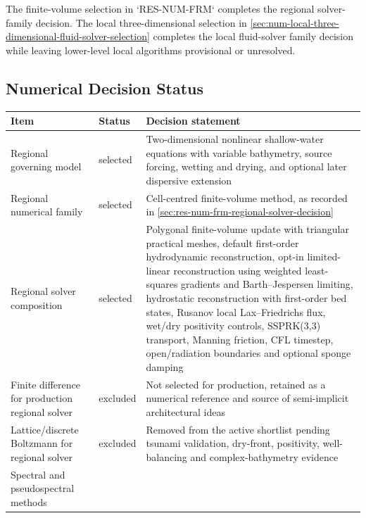 The finite-volume selection in `RES-NUM-FRM` completes the regional
solver-family decision. The local three-dimensional selection in
\cref{sec:num-local-three-dimensional-fluid-solver-selection} completes
the local fluid-solver family decision while leaving lower-level local
algorithms provisional or unresolved.

\subsection{Numerical Decision Status}
\label{sec:res-num-spec-numerical-decision-status}

\begin{table}[htbp]
  \centering
  \small
  \renewcommand{\arraystretch}{1.2}
  \begin{tabular}{
      p{}
      p{}
      p{}
    }
    \hline
    Item
    &
    Status
    &
    Decision statement
    \\
    \hline
    Regional governing model
    &
    selected
    &
    Two-dimensional nonlinear shallow-water equations with variable
    bathymetry, source forcing, wetting and drying, and optional later
    dispersive extension
    \\
    Regional numerical family
    &
    selected
    &
    Cell-centred finite-volume method, as recorded in
    \cref{sec:res-num-frm-regional-solver-decision}
    \\
    Regional solver composition
    &
    selected
    &
    Polygonal finite-volume update with triangular practical meshes,
    default first-order hydrodynamic reconstruction, opt-in
    limited-linear reconstruction using weighted least-squares gradients
    and Barth--Jespersen limiting, hydrostatic reconstruction with
    first-order bed states, Rusanov local Lax--Friedrichs flux,
    wet/dry positivity controls, SSPRK(3,3) transport, Manning friction,
    CFL timestep, open/radiation boundaries and optional sponge damping
    \\
    Finite difference for production regional solver
    &
    excluded
    &
    Not selected for production, retained as a numerical reference and
    source of semi-implicit architectural ideas
    \\
    Lattice/discrete Boltzmann for regional solver
    &
    excluded
    &
    Removed from the active shortlist pending tsunami validation,
    dry-front, positivity, well-balancing and complex-bathymetry evidence
    \\
    Spectral and pseudospectral methods

\end{tabular}
\end{table}
